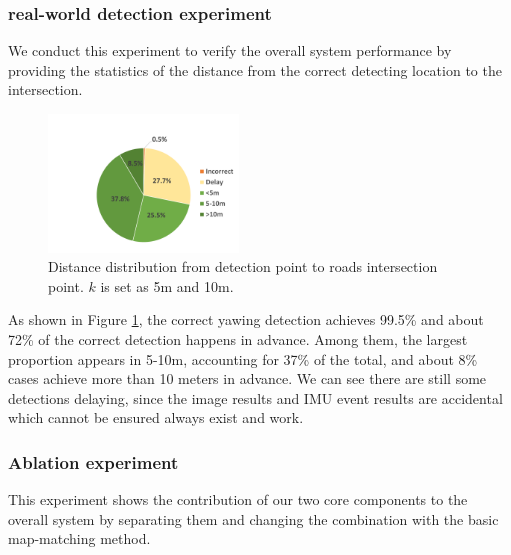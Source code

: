 \documentclass[journal]{IEEEtran}
\begin{document}
\subsubsection{real-world detection experiment}
We conduct this experiment to verify the overall system performance by providing the statistics of the distance from the correct detecting location to the intersection. 

\begin{figure}[htbp]
    \centerline{\includegraphics[width=0.45\textwidth]{fig/pie_chart.pdf}}
    \caption{Distance distribution from detection point to roads intersection point. $k$ is set as 5m and 10m.}
    \label{fig:pie_chart}
\end{figure}

As shown in Figure \ref{fig:pie_chart}, the correct yawing detection achieves 99.5\% and about 72\% of the correct detection happens in advance. 
Among them, the largest proportion appears in 5-10m, accounting for 37\% of the total, and about 8\% cases achieve more than 10 meters in advance.
We can see there are still some detections delaying, since the image results and IMU event results are accidental which cannot be ensured always exist and work. 


\subsubsection{Ablation experiment}
This experiment shows the contribution of our two core components to the overall system by separating them and changing the combination with the basic map-matching method.
\end{document}
